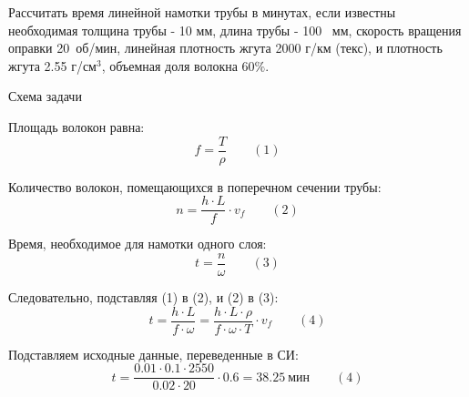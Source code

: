 
Рассчитать время линейной намотки трубы в минутах, если
известны необходимая толщина трубы - 10 мм, длина трубы - 100  мм, скорость вращения оправки 20~об/мин, 
линейная плотность жгута 2000 г/км (текс), и плотность жгута 2.55 г/см$^3$,
объемная доля волокна $60\%$.

\explanationSection

\begin{center}
    Схема задачи
\end{center}

Площадь волокон равна:
$$f=  \frac{T}{\rho} \qquad (1)$$

Количество волокон, помещающихся в поперечном сечении трубы:
$$n=\frac{h\cdot L}{f}\cdot v_f \qquad (2)$$

Время, необходимое для намотки одного слоя:
$$t=\frac{n}{\omega} \qquad (3)$$

Следовательно, подставляя (1) в (2), и (2) в (3):
$$t=\frac{h\cdot L}{f\cdot \omega}=\frac{h\cdot L\cdot \rho}{f\cdot \omega\cdot T}\cdot v_f \qquad (4)$$

Подставляем исходные данные, переведенные в СИ:
$$t=\frac{0.01\cdot 0.1\cdot 2550}{0.02\cdot 20}\cdot 0.6=38.25 \: \text{мин} \qquad (4)$$


